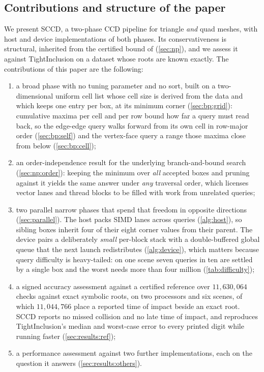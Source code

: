 \subsection{Contributions and structure of the paper}
\label{sec:contribution}

We present SCCD, a two-phase CCD pipeline for triangle \emph{and} quad meshes,
with host and device implementations of both phases. Its conservativeness is
structural, inherited from the certified bound of \citet{wang2021tight}
(\cref{sec:np}), and we assess it against TightInclusion on a dataset whose
roots are known exactly. The contributions of this paper are the following:

\begin{enumerate}
  \item a broad phase with no tuning parameter and no sort, built on a
        two-dimensional uniform cell list whose cell size is derived from the
        data and which keeps one entry per box, at its minimum corner
        (\cref{sec:bp:grid}): cumulative maxima per cell and per row bound how
        far a query must read back, so the edge-edge query walks forward from
        its own cell in row-major order (\cref{sec:bp:self}) and the vertex-face
        query a range those maxima close from below (\cref{sec:bp:cell});
  \item an order-independence result for the underlying branch-and-bound search
        (\cref{sec:np:order}): keeping the minimum over \emph{all} accepted
        boxes and pruning against it yields the same answer under \emph{any}
        traversal order, which licenses vector lanes and thread blocks to be
        filled with work from unrelated queries;
  \item two parallel narrow phases that spend that freedom in opposite
        directions (\cref{sec:parallel}). The host packs SIMD lanes across
        queries (\cref{alg:host}), so sibling boxes inherit four of their eight
        corner values from their parent. The device pairs a deliberately
        \emph{small} per-block stack with a double-buffered global queue that
        the next launch redistributes (\cref{alg:device}), which matters
        because query difficulty is heavy-tailed: on one scene seven queries in
        ten are settled by a single box and the worst needs more than four
        million (\cref{tab:difficulty});
  \item a signed accuracy assessment against a certified reference over
        $11{,}630{,}064$ checks against exact symbolic roots, on two processors
        and six scenes, of which $11{,}044{,}766$ place a reported time of
        impact beside an exact root. SCCD reports no missed collision and no
        late time of impact, and reproduces TightInclusion's median and
        worst-case error to every printed digit while running faster
        (\cref{sec:results:ref});
  \item a performance assessment against two further implementations, each on
        the question it answers (\cref{sec:results:others}).
\end{enumerate}

